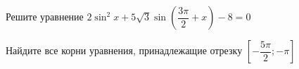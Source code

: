 \begin{ex}
	\begin{condition}
		\begin{enumcols}[label=\asbuk*)]
			\item Решите уравнение \( 2\sin^2 x + 5\sqrt{3}\sin{\left(\dfrac{3\pi}{2}+x\right)}  - 8= 0 \)
			\item Найдите все корни уравнения, принадлежащие отрезку \(  \left[-\dfrac{5\pi}{2};-\pi\right] \)
		\end{enumcols}
	\end{condition}
\end{ex}